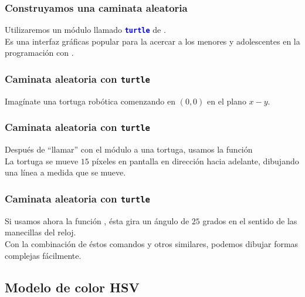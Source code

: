 \documentclass[12pt]{beamer}
\begin{document}
\begin{frame}
\frametitle{Construyamos una caminata aleatoria}
Utilizaremos un módulo llamado \textcolor{blue}{\textbf{\texttt{turtle}}} de \python.
\\
\bigskip
\pause
Es una interfaz gráficas popular para la acercar a los menores y adolescentes en la programación con .
\end{frame}
\begin{frame}
\frametitle{Caminata aleatoria con \texttt{turtle}}
Imagínate una tortuga robótica comenzando en $(0, 0)$ en el plano $x-y$.
\end{frame}
\begin{frame}
\frametitle{Caminata aleatoria con \texttt{turtle}}
Después de \enquote{llamar} con el módulo a una tortuga, usamos la función 
\\
\bigskip
\pause
La tortuga se mueve $15$ píxeles en pantalla en dirección hacia adelante, dibujando una línea a medida que se mueve.
\end{frame}
\begin{frame}
\frametitle{Caminata aleatoria con \texttt{turtle}}
Si usamos ahora la función , ésta gira un ángulo de $25$ grados en el sentido de las manecillas del reloj.
\\
\bigskip
\pause
Con la combinación de éstos comandos y otros similares, podemos dibujar formas complejas fácilmente.
\end{frame}

\subsection*{Modelo de color HSV}
\end{document}
